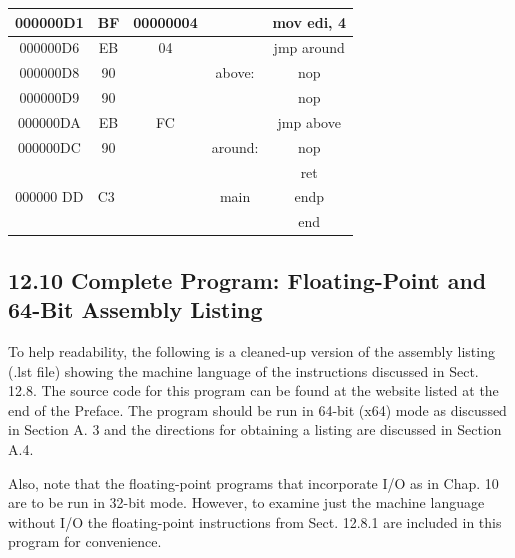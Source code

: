 \documentclass[10pt]{book}
\begin{document}
\begin{center}
\begin{center}
\begin{center}
\begin{center}
\begin{center}
\begin{center}
\begin{tabular}{|c|c|c|c|c|}
\hline
000000D1 & BF & 00000004 &  & mov edi, 4 \\
\hline
000000D6 & EB & 04 &  & jmp around \\
\hline
000000D8 & 90 &  & above: & nop \\
\hline
000000D9 & 90 &  &  & nop \\
\hline
000000DA & EB & FC &  & jmp above \\
\hline
000000DC & 90 &  & around: & nop \\
\hline
\multirow[t]{3}{*}{000000 DD} & \multicolumn{2}{|l|}{\multirow[t]{3}{*}{C3}} &  & ret \\
\hline
 &  &  & main & endp \\
\hline
 &  &  &  & end \\
\hline
\end{tabular}
\end{center}

\subsection*{12.10 Complete Program: Floating-Point and 64-Bit Assembly Listing}
To help readability, the following is a cleaned-up version of the assembly listing (.lst file) showing the machine language of the instructions discussed in Sect. 12.8. The source code for this program can be found at the website listed at the end of the Preface. The program should be run in 64-bit (x64) mode as discussed in Section A. 3 and the directions for obtaining a listing are discussed in Section A.4.


Also, note that the floating-point programs that incorporate I/O as in Chap. 10 are to be run in 32-bit mode. However, to examine just the machine language without I/O the floating-point instructions from Sect. 12.8.1 are included in this program for convenience.


\end{center}
\end{center}
\end{center}
\end{center}
\end{center}
\end{document}
